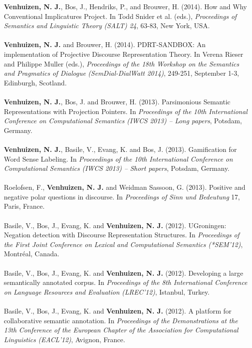 \documentclass[a4paper,10pt]{article}
\begin{document}
\noindent
    \textbf{Venhuizen, N. J.}, Bos, J., Hendriks, P., and Brouwer, H. (2014).
    How and Why Conventional Implicatures Project. In Todd Snider et al.
    (eds.), \textit{Proceedings of Semantics and Linguistic Theory (SALT) 24},
    63-83, New York, USA.\\
    \\
    \textbf{Venhuizen, N. J.} and Brouwer, H. (2014). PDRT-SANDBOX: An
    implementation of Projective Discourse Representation Theory. In Verena
    Rieser and Philippe Muller (eds.), \textit{Proceedings of the 18th
    Workshop on the Semantics and Pragmatics of Dialogue (SemDial-DialWatt
    2014)}, 249-251, September 1-3, Edinburgh, Scotland.\\
    \\
    \textbf{Venhuizen, N. J.}, Bos, J. and Brouwer, H. (2013). Parsimonious 
    Semantic Representations with Projection Pointers. In \textit{Proceedings
    of the 10th International Conference on Computational Semantics (IWCS 2013)
    -- Long papers}, Potsdam, Germany.\\
    \\
    \textbf{Venhuizen, N. J.}, Basile, V., Evang, K. and Bos, J. (2013).
    Gamification for Word Sense Labeling. In \textit{Proceedings of the 10th 
    International Conference on Computational Semantics (IWCS 2013) --
    Short papers}, Potsdam, Germany.\\
    \\
    Roelofsen, F., \textbf{Venhuizen, N. J.} and Weidman Sassoon, G. (2013).
    Positive and negative polar questions in discourse. In \textit{Proceedings of
    Sinn und Bedeutung} 17, Paris, France.\\
    \\
    Basile, V., Bos, J., Evang, K. and \textbf{Venhuizen, N. J.} (2012). UGroningen:
    Negation detection with Discourse Representation Structures. In
    \textit{Proceedings of the First Joint Conference on Lexical and Computational
    Semantics (*SEM'12)}, Montr\'eal, Canada.\\
    \\
    Basile, V., Bos, J., Evang, K. and \textbf{Venhuizen, N. J.} (2012). Developing
    a large semantically annotated corpus. In \textit{Proceedings of the 8th
    International Conference on Language Resources and Evaluation (LREC'12)},
    Istanbul, Turkey.\\
    \\
    Basile, V., Bos, J., Evang, K. and \textbf{Venhuizen, N. J.} (2012). A platform
    for collaborative semantic annotation. In \textit{Proceedings of the
    Demonstrations at the 13th Conference of the European Chapter of the
    Association for Computational Linguistics (EACL'12)}, Avignon, France.
\end{document}
